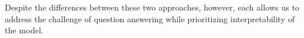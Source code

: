 Despite the differences between these two approaches, however, each allows us to address the challenge of question answering while prioritizing interpretability of the model.






%
%
%

